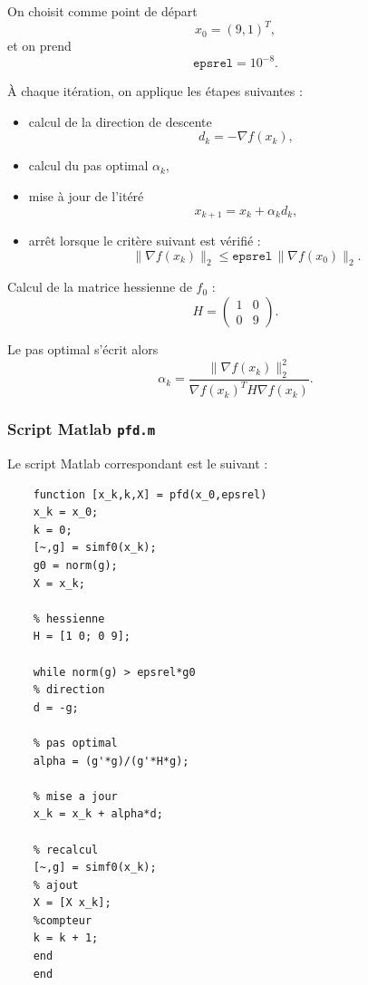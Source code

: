 \documentclass[a4paper,12pt]{article}
\begin{document}
	On choisit comme point de départ
	\begin{equation}
	x_0=(9,1)^T,
	\end{equation}
	et on prend
	\begin{equation}
	\texttt{epsrel}=10^{-8}.
	\end{equation}
	
	À chaque itération, on applique les étapes suivantes :
	\begin{itemize}
		\item calcul de la direction de descente
		\begin{equation}
		d_k=-\nabla f(x_k),
		\end{equation}
		\item calcul du pas optimal $\alpha_k$,
		\item mise à jour de l'itéré
		\begin{equation}
		x_{k+1}=x_k+\alpha_k d_k,
		\end{equation}
		\item arrêt lorsque le critère suivant est vérifié :
		\begin{equation}
		\|\nabla f(x_k)\|_2 \leq \texttt{epsrel}\,\|\nabla f(x_0)\|_2.
		\end{equation}
	\end{itemize}
	
	Calcul de la matrice hessienne de $f_0$ :
	\begin{equation}
	H=
	\begin{pmatrix}
	1 & 0\\
	0 & 9
	\end{pmatrix}.
	\end{equation}
	
	Le pas optimal s'écrit alors
	\begin{equation}
	\alpha_k = \frac{\|\nabla f(x_k)\|_2^2}{\nabla f(x_k)^T H\nabla f(x_k)}.
	\end{equation}
	
	\subsubsection{Script Matlab \texttt{pfd.m}}
	
	Le script Matlab correspondant est le suivant :
	
	\begin{verbatim}
	function [x_k,k,X] = pfd(x_0,epsrel)
	x_k = x_0;
	k = 0;
	[~,g] = simf0(x_k);
	g0 = norm(g);
	X = x_k;
	
	% hessienne
	H = [1 0; 0 9];
	
	while norm(g) > epsrel*g0
	% direction
	d = -g;
	
	% pas optimal
	alpha = (g'*g)/(g'*H*g);
	
	% mise a jour
	x_k = x_k + alpha*d;
	
	% recalcul
	[~,g] = simf0(x_k);
	% ajout
	X = [X x_k];
	%compteur
	k = k + 1;
	end
	end
	\end{verbatim}
	
\end{document}
